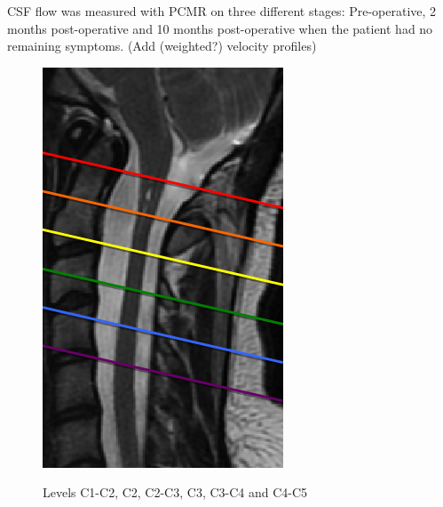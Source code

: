 CSF flow was measured with PCMR on three different stages: Pre-operative, 2 months post-operative and 10 months post-operative when the patient had no remaining symptoms. (Add (weighted?) velocity profiles)
 


\begin{figure}[!ht]
\begin{center}
\includegraphics[scale=0.6]{figures/Syrinx_Levels} \\
\caption{Levels C1-C2, C2, C2-C3, C3, C3-C4 and C4-C5}
\end{center}
\end{figure}

